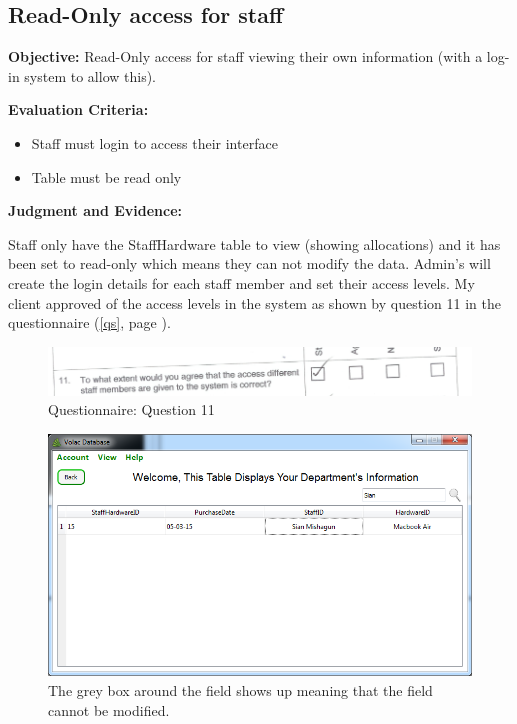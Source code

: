 \subsection{Read-Only access for staff}

\textbf{Objective:} Read-Only access for staff viewing their own information (with a log-in system to allow this).

\textbf{Evaluation Criteria:}
\begin{itemize}
\item{Staff must login to access their interface}
\item{Table must be read only}
\end{itemize}

\textbf{Judgment and Evidence:}

Staff only have the StaffHardware table to view (showing allocations) and it has been set to read-only which means they can not modify the data. Admin's will create the login details for each staff member and set their access levels. My client approved of the access levels in the system as shown by question 11 in the questionnaire (\ref{qs}, page \pageref{qs}).

\begin{figure}[H]
    \includegraphics[width=\textwidth]{./Evaluation/EvaluationQuestionnaire/11.png}
    \caption{Questionnaire: Question 11} 
\end{figure}

\begin{figure}[H]
    \includegraphics[width=\textwidth]{./Evaluation/Images/readonlymanager.png}
    \caption{The grey box around the field shows up meaning that the field cannot be modified.} 
\end{figure}

